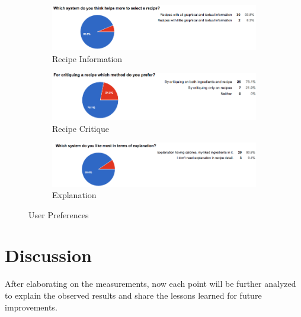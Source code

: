 	  \begin{figure}[h]
	  	\centering
	  	\begin{subfigure}{.80\textwidth}
	  		\includegraphics[width=.9\linewidth]{figures/ch5_stat_user_preference_recipe_info}
	  		\caption{Recipe Information}
	  	\end{subfigure}
	  	\begin{subfigure}{.80\textwidth}
	  		\includegraphics[width=.9\linewidth]{figures/ch5_stat_user_preference_recipe_critique}
	  		\caption{Recipe Critique}
	  	\end{subfigure}
	  	\begin{subfigure}{.80\textwidth}
	  		\includegraphics[width=.9\linewidth]{figures/ch5_stat_user_preference_recipe_explanation}
	  		\caption{Explanation}
	  	\end{subfigure}
	  	\caption{User Preferences}
	  	\label{fig:ch5_stat_user_preference}
	  \end{figure}
	  
\section{Discussion}

After elaborating on the measurements, now each point will be further analyzed to explain the observed results and share the lessons learned for future improvements. \newline


